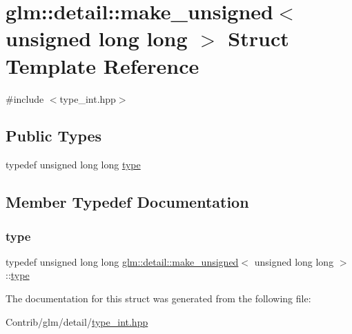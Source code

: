 \hypertarget{structglm_1_1detail_1_1make__unsigned_3_01unsigned_01long_01long_01_4}{}\section{glm\+:\+:detail\+:\+:make\+\_\+unsigned$<$ unsigned long long $>$ Struct Template Reference}
\label{structglm_1_1detail_1_1make__unsigned_3_01unsigned_01long_01long_01_4}


{\ttfamily \#include $<$type\+\_\+int.\+hpp$>$}

\subsection*{Public Types}
\begin{DoxyCompactItemize}
\item 
typedef unsigned long long \mbox{\hyperlink{structglm_1_1detail_1_1make__unsigned_3_01unsigned_01long_01long_01_4_a3f3f1eb1cbdd286e6cb4afb5fa71d5c7}{type}}
\end{DoxyCompactItemize}


\subsection{Member Typedef Documentation}
\mbox{\label{structglm_1_1detail_1_1make__unsigned_3_01unsigned_01long_01long_01_4_a3f3f1eb1cbdd286e6cb4afb5fa71d5c7}} 
\subsubsection{\texorpdfstring{type}{type}}
{\footnotesize\ttfamily typedef unsigned long long \mbox{\hyperlink{structglm_1_1detail_1_1make__unsigned}{glm\+::detail\+::make\+\_\+unsigned}}$<$ unsigned long long $>$\+::\mbox{\hyperlink{structglm_1_1detail_1_1make__unsigned_3_01unsigned_01long_01long_01_4_a3f3f1eb1cbdd286e6cb4afb5fa71d5c7}{type}}}



The documentation for this struct was generated from the following file\+:\begin{DoxyCompactItemize}
\item 
Contrib/glm/detail/\mbox{\hyperlink{type__int_8hpp}{type\+\_\+int.\+hpp}}\end{DoxyCompactItemize}
